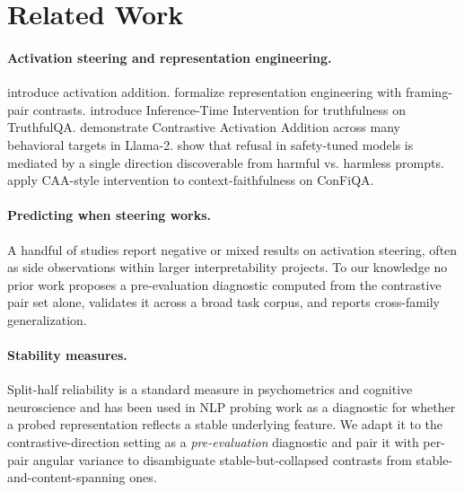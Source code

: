 \documentclass[11pt]{article}
\begin{document}
\section{Related Work}

\paragraph{Activation steering and representation engineering.}
\citet{turner2023activation} introduce activation addition.
\citet{zou2023representation} formalize representation engineering
with framing-pair contrasts. \citet{li2023iti} introduce
Inference-Time Intervention for truthfulness on TruthfulQA.
\citet{rimsky2023steering} demonstrate Contrastive Activation
Addition across many behavioral targets in Llama-2.
\citet{arditi2024refusal} show that refusal in safety-tuned models
is mediated by a single direction discoverable from harmful vs.
harmless prompts. \citet{yang2026contextfocus} apply CAA-style
intervention to context-faithfulness on ConFiQA.

\paragraph{Predicting when steering works.}
A handful of studies report negative or mixed results on activation
steering, often as side observations within larger interpretability
projects. To our knowledge no prior work proposes a pre-evaluation
diagnostic computed from the contrastive pair set alone, validates it
across a broad task corpus, and reports cross-family generalization.

\paragraph{Stability measures.}
Split-half reliability is a standard measure in psychometrics and
cognitive neuroscience and has been used in NLP probing work as a
diagnostic for whether a probed representation reflects a stable
underlying feature. We adapt it to the contrastive-direction setting
as a \emph{pre-evaluation} diagnostic and pair it with per-pair
angular variance to disambiguate stable-but-collapsed contrasts from
stable-and-content-spanning ones.
\end{document}
